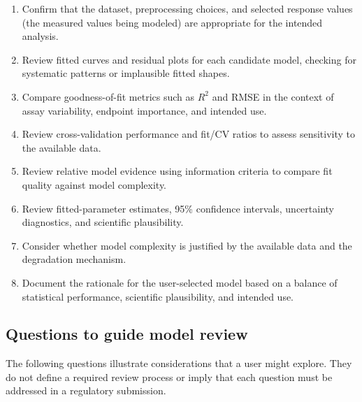 \begin{enumerate}
    \item Confirm that the dataset, preprocessing choices, and selected response values (the measured values being modeled) are appropriate for the intended analysis.
    \item Review fitted curves and residual plots for each candidate model, checking for systematic patterns or implausible fitted shapes.
    \item Compare goodness-of-fit metrics such as \(R^2\) and RMSE in the context of assay variability, endpoint importance, and intended use.
    \item Review cross-validation performance and fit/CV ratios to assess sensitivity to the available data.
    \item Review relative model evidence using information criteria to compare fit quality against model complexity.
    \item Review fitted-parameter estimates, 95\% confidence intervals, uncertainty diagnostics, and scientific plausibility.
    \item Consider whether model complexity is justified by the available data and the degradation mechanism.
    \item Document the rationale for the user-selected model based on a balance of statistical performance, scientific plausibility, and intended use.
\end{enumerate}


\subsection{Questions to guide model review}

The following questions illustrate considerations that a user might explore. They do not define a required review process or imply that each question must be addressed in a regulatory submission.

